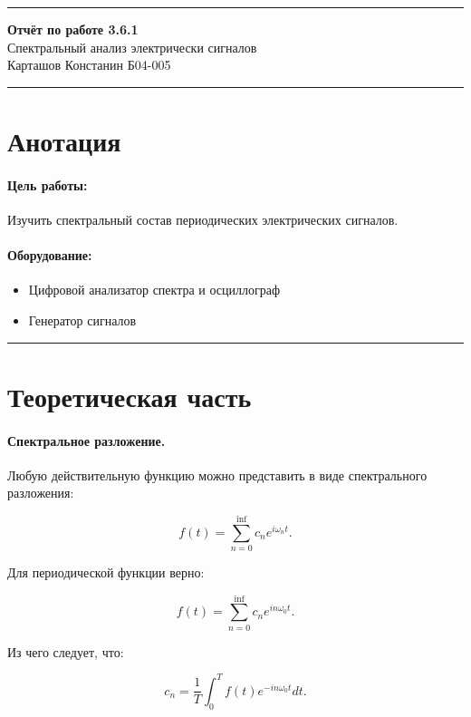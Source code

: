 \documentclass[a4paper,12pt]{article} %
\begin{document}


\hrule 	
\medskip
\begin{raggedright}
{\large \textbf{Отчёт по работе 3.6.1}}
\\
\medskip
{\Large Спектральный анализ электрически сигналов} 
\\
\medskip
{\large Карташов Констанин Б04-005}
\medskip
\hrule
\medskip
\end{raggedright}


\section{Анотация}

\paragraph{Цель работы:} 
Изучить спектральный состав периодических электрических сигналов.

\paragraph{Оборудование:}
\begin{itemize}
\renewcommand{\labelitemi}{$\triangleright$}
\itemsep0em
\item Цифровой анализатор спектра и осциллограф
\item Генератор сигналов
\end{itemize}


\medskip\hrule\medskip

\section{Теоретическая часть}

\paragraph{Спектральное разложение.} Любую действительную функцию можно представить в виде спектрального разложения:

\[ f(t) = \sum_{n=0}^{\inf} c_n e^{i\omega_n t}. \]

Для периодической функции верно:

\[ f(t) = \sum_{n=0}^{\inf} c_n e^{i n \omega_0 t}. \]

Из чего следует, что:

\[ c_n = \frac{1}{T}\int_0^T f(t) e^{-in \omega_0 t} dt. \]
\end{document}
